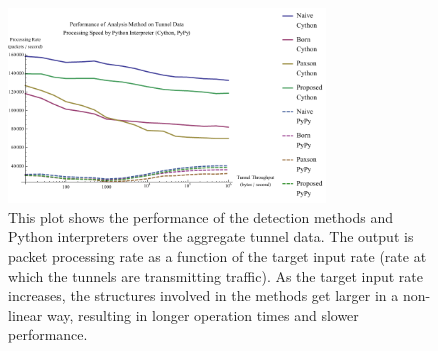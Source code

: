 \documentclass{llncs}
\begin{document}
\begin{figure}
\centering
\includegraphics[width=0.75\textwidth]{../figures/pmat.pdf}
\caption[Performance of Analysis Method and Python Interpreter on Aggregate
Tunnel Data]{This plot shows the performance of the detection methods and Python
interpreters over the aggregate tunnel data. The output is packet processing
rate as a function of the target input rate (rate at which the tunnels are
transmitting traffic). As the target input rate increases, the structures
involved in the methods get larger in a non-linear way, resulting in longer
operation times and slower performance.}
\label{pmat}
\end{figure}



\end{document}
